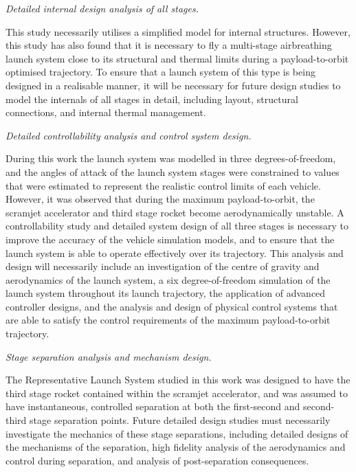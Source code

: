 \vspace{10pt}
\textit{Detailed internal design analysis of all stages.}

\noindent
This study necessarily utilises a simplified model for internal structures. However, this study has also found that it is necessary to fly a multi-stage airbreathing launch system close to its structural and thermal limits during a payload-to-orbit optimised trajectory. To ensure that a launch system of this type is being designed in a realisable manner, it will be necessary for future design studies to model the internals of all stages in detail, including layout, structural connections, and internal thermal management.  

\vspace{10pt}
	\textit{Detailed controllability analysis and control system design.}

\noindent
During this work the launch system was modelled in three degrees-of-freedom, and the angles of attack of the launch system stages were constrained to values that were estimated to represent the realistic control limits of each vehicle. However, it was observed that during the maximum payload-to-orbit, the scramjet accelerator and third stage rocket become aerodynamically unstable.
A controllability study and detailed system design of all three stages is necessary to improve the accuracy of the vehicle simulation models, and to ensure that the launch system is able to operate effectively over its trajectory. This analysis and design will necessarily include an investigation of the centre of gravity and aerodynamics of the launch system, a six degree-of-freedom simulation of the launch system throughout its launch trajectory, the application of advanced controller designs, and the analysis and design of physical control systems that are able to satisfy the control requirements of the maximum payload-to-orbit trajectory. 


\vspace{10pt}
	\textit{Stage separation analysis and mechanism design.}
	
\noindent
The Representative Launch System studied in this work was designed to have the third stage rocket contained within the scramjet accelerator, and was assumed to have instantaneous, controlled separation at both the first-second and second-third stage separation points. Future detailed design studies must necessarily investigate the mechanics of these stage separations, including detailed designs of the mechanisms of the separation, high fidelity analysis of the aerodynamics and control during separation, and analysis of post-separation consequences.


